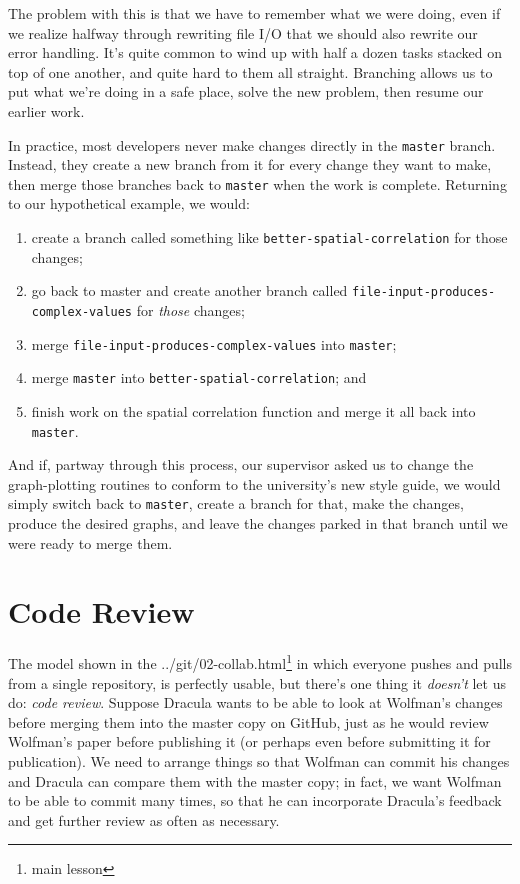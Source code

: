 \documentclass[]{book}
\newcommand{\urlfoot}[2]{{#1}\footnote{#2}}
\newcommand{\gdef}[2]{\emph{#2}}
\begin{document}
The problem with this is that we have to remember what we were doing,
even if we realize halfway through rewriting file I/O that we should
also rewrite our error handling. It's quite common to wind up with half
a dozen tasks stacked on top of one another, and quite hard to them all
straight. Branching allows us to put what we're doing in a safe place,
solve the new problem, then resume our earlier work.

In practice, most developers never make changes directly in the
\texttt{master} branch. Instead, they create a new branch from it for
every change they want to make, then merge those branches back to
\texttt{master} when the work is complete. Returning to our hypothetical
example, we would:

\begin{enumerate}
\item
  create a branch called something like
  \texttt{better-spatial-correlation} for those changes;
\item
  go back to master and create another branch called
  \texttt{file-input-produces-complex-values} for \emph{those} changes;
\item
  merge \texttt{file-input-produces-complex-values} into
  \texttt{master};
\item
  merge \texttt{master} into \texttt{better-spatial-correlation}; and
\item
  finish work on the spatial correlation function and merge it all back
  into \texttt{master}.
\end{enumerate}

And if, partway through this process, our supervisor asked us to change
the graph-plotting routines to conform to the university's new style
guide, we would simply switch back to \texttt{master}, create a branch
for that, make the changes, produce the desired graphs, and leave the
changes parked in that branch until we were ready to merge them.

\section{Code Review}

The model shown in the \urlfoot{../git/02-collab.html}{main lesson} in
which everyone pushes and pulls from a single repository, is perfectly
usable, but there's one thing it \emph{doesn't} let us do:
\gdef{g:code-review}{code review}. Suppose Dracula wants to be able
to look at Wolfman's changes before merging them into the master copy on
GitHub, just as he would review Wolfman's paper before publishing it (or
perhaps even before submitting it for publication). We need to arrange
things so that Wolfman can commit his changes and Dracula can compare
them with the master copy; in fact, we want Wolfman to be able to commit
many times, so that he can incorporate Dracula's feedback and get
further review as often as necessary.
\end{document}
